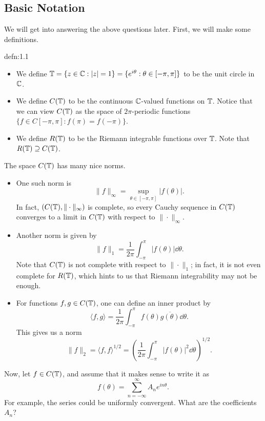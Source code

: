 \subsection{Basic Notation} \label{subsec:1.3}
We will get into answering the above questions later. First, we will make 
some definitions.

\begin{defn}{defn:1.1}
    \begin{itemize}
        \item We define $\mathbb{T} = \{z \in \mathbb{C} : |z| = 1\} = 
        \{e^{i\theta} : \theta \in [-\pi, \pi]\}$ to be the unit circle in $\mathbb{C}$. 
        \item We define $C(\mathbb{T})$ to be the continuous $\mathbb{C}$-valued functions 
        on $\mathbb{T}$. Notice that we can view $C(\mathbb{T})$ as the space of
        $2\pi$-periodic functions $\{f \in C[-\pi, \pi] : f(\pi) = f(-\pi)\}$.
        \item We define $R(\mathbb{T})$ to be the Riemann integrable functions 
        over $\mathbb{T}$. Note that $R(\mathbb{T}) \supseteq C(\mathbb{T})$. 
    \end{itemize}
\end{defn}

The space $C(\mathbb{T})$ has many nice norms. 
\begin{itemize}
    \item One such norm is 
    \[ \|f\|_\infty = \sup_{\theta \in [-\pi, \pi]} |f(\theta)|. \] 
    In fact, $(C(\mathbb{T}), \|\cdot\|_\infty)$ is complete, so every 
    Cauchy sequence in $C(\mathbb{T})$ converges to a limit in $C(\mathbb{T})$ with respect to 
    $\|\cdot\|_\infty$.
    \item Another norm is given by 
    \[ \|f\|_1 = \frac{1}{2\pi} \int_{-\pi}^\pi |f(\theta)|\dd\theta. \] 
    Note that $C(\mathbb{T})$ is not complete with respect to $\|\cdot\|_1$; 
    in fact, it is not even complete for $R(\mathbb{T})$, which hints to us that 
    Riemann integrability may not be enough. 
    \item For functions $f, g \in C(\mathbb{T})$, one can define an inner product by 
    \[ \langle f, g \rangle = \frac{1}{2\pi} \int_{-\pi}^\pi f(\theta) 
    \overline{g(\theta)}\dd\theta. \] 
    This gives us a norm 
    \[ \|f\|_2 = \langle f, f \rangle^{1/2} = 
    \left( \frac{1}{2\pi} \int_{-\pi}^\pi |f(\theta)|^2\dd\theta \right)^{\!1/2}. \] 
\end{itemize} 
Now, let $f \in C(\mathbb{T})$, and assume that it makes sense to write it as 
\[ f(\theta) = \sum_{n=-\infty}^\infty A_n e^{in\theta}. \] 
For example, the series could be uniformly convergent. What are the 
coefficients $A_n$?

